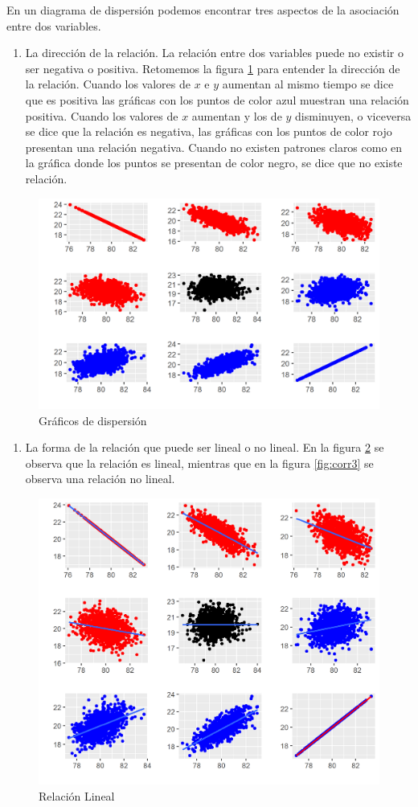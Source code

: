 \documentclass[
]{krantz}
\providecommand{\tightlist}{%
  \setlength{\itemsep}{0pt}\setlength{\parskip}{0pt}}
\begin{document}
En un diagrama de dispersión podemos encontrar tres aspectos de la asociación entre dos variables.

\begin{enumerate}
\def\labelenumi{\arabic{enumi}.}
\tightlist
\item
  La dirección de la relación. La relación entre dos variables puede no existir o ser negativa o positiva. Retomemos la figura \ref{fig:corr} para entender la dirección de la relación. Cuando los valores de \(x\) e \(y\) aumentan al mismo tiempo se dice que es positiva las gráficas con los puntos de color azul muestran una relación positiva. Cuando los valores de \(x\) aumentan y los de \(y\) disminuyen, o viceversa se dice que la relación es negativa, las gráficas con los puntos de color rojo presentan una relación negativa. Cuando no existen patrones claros como en la gráfica donde los puntos se presentan de color negro, se dice que no existe relación.
\end{enumerate}

\begin{figure}[!h]

{\centering \includegraphics[width=0.5\linewidth]{corr} 

}

\caption{Gráficos de dispersión}\label{fig:corr}
\end{figure}

\begin{enumerate}
\def\labelenumi{\arabic{enumi}.}
\setcounter{enumi}{1}
\tightlist
\item
  La forma de la relación que puede ser lineal o no lineal. En la figura \ref{fig:corr2} se observa que la relación es lineal, mientras que en la figura \ref{fig:corr3} se observa una relación no lineal.
\end{enumerate}

\begin{figure}[!h]

{\centering \includegraphics[width=0.5\linewidth]{corr2} 

}

\caption{Relación Lineal}\label{fig:corr2}
\end{figure}
\end{document}
